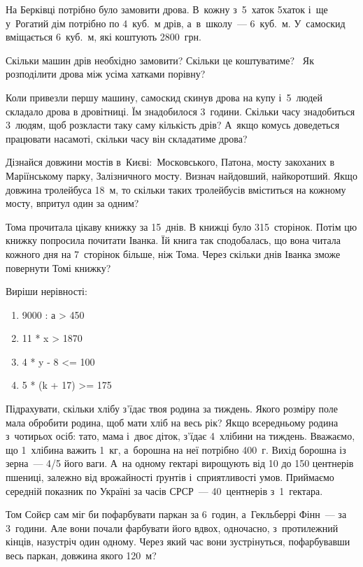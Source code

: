 \problem
На Берківці потрібно було замовити дрова.
В~кожну з~5~хаток 5хаток і~ще у~Рогатий дім потрібно по 4~куб.~м дрів,
а~в~школу~--- 6~куб.~м.
У~самоскид вміщається 6~куб.~м, які коштують 2800~грн.

Скільки машин дрів необхідно замовити? Скільки це коштуватиме? 
Як розподілити дрова між усіма хатками порівну?

Коли привезли першу машину, самоскид скинув дрова на купу і~5~людей
складало дрова в дровітниці. Їм знадобилося 3~години.
Скільки часу знадобиться 3~людям, щоб розкласти таку саму кількість дрів?
А~якщо комусь доведеться працювати насамоті, скільки часу він складатиме дрова?


\problem
Дізнайся довжини мостів в~Києві: Московського, Патона,
мосту закоханих в Маріїнському парку, Залізничного мосту.
Визнач найдовший, найкоротший.
Якщо довжина тролейбуса 18~м, то скільки таких тролейбусів
вміститься на кожному мосту, впритул один за одним?


\problem
Тома прочитала цікаву книжку за 15~днів. В книжці було 315~сторінок.
Потім цю книжку попросила почитати Іванка. Їй книга так сподобалась,
що вона читала кожного дня на 7~сторінок більше, ніж Тома.
Через скільки днів Іванка зможе повернути Томі книжку?


\problem
Виріши нерівності:
\begin{multicols}{2}
    \begin{enumerate}
        \item 9000 : а > 450
        \item 11 * x > 1870
        \item 4 * y - 8 <= 100
        \item 5 * (k + 17) >= 175
    \end{enumerate}
\end{multicols}


\problem
Підрахувати, скільки хлібу з’їдає твоя родина за тиждень.
Якого розміру поле мала обробити родина, щоб мати хліб на весь рік?
Якщо всередньому родина з~чотирьох осіб: тато, мама і~двоє діток,
з’їдає 4~хлібини на тиждень. Вважаємо, що 1~хлібина важить 1~кг,
а~борошна на неї потрібно 400~г. Вихід борошна із зерна~--- 4/5 його ваги.
А~на одному гектарі вирощують від 10 до 150 центнерів пшениці,
залежно від врожайності ґрунтів і~сприятливості умов.
Приймаємо середній показник по Україні за часів СРСР~---
40~центнерів з~1~гектара.


\problem
Том Сойєр сам міг би пофарбувати паркан за 6~годин,
а~Гекльберрі Фінн~--- за 3~години. Але вони почали фарбувати його вдвох,
одночасно, з~протилежний кінців, назустріч один одному.
Через який час вони зустрінуться, пофарбувавши весь паркан,
довжина якого 120~м?


